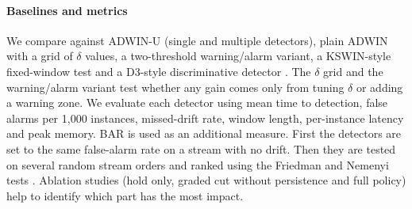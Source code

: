 \documentclass[conference]{IEEEtran}
\begin{document}
\paragraph{Baselines and metrics}
We compare against ADWIN-U (single and multiple detectors), plain ADWIN with a grid of $\delta$ values, a two-threshold warning/alarm variant, a KSWIN-style fixed-window test \cite{raab2020} and a D3-style discriminative detector \cite{gozuacik2019}. The $\delta$ grid and the warning/alarm variant test whether any gain comes only from tuning $\delta$ or adding a warning zone. We evaluate each detector using mean time to detection, false alarms per 1,000 instances, missed-drift rate, window length, per-instance latency and peak memory. BAR \cite{assis2025} is used as an additional measure. First the detectors are set to the same false-alarm rate on a stream with no drift. Then they are tested on several random stream orders and ranked using the Friedman and Nemenyi tests \cite{demsar2006}. Ablation studies (hold only, graded cut without persistence and full policy) help to identify which part has the most impact.
\end{document}
